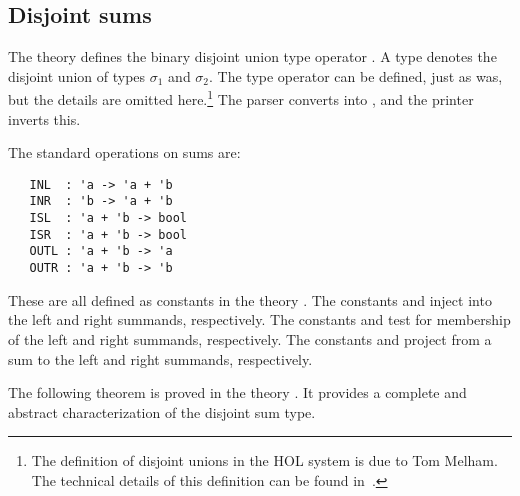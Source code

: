 \subsection{Disjoint sums}
\label{sum}


The theory  defines the binary disjoint union type
operator .  A type 
denotes the disjoint union of types $\sigma_1$ and $\sigma_2$.  The
type operator  can be defined, just as  was,
but the details are omitted here.\footnote{The definition of disjoint
  unions in the HOL system is due to Tom Melham. The technical details
  of this definition can be found in~\cite{Melham-banff}.}  The \HOL{}
parser
%
%
converts 
%
%
into , and the printer inverts
this.

The standard operations on sums are:

\begin{hol}
{\small
\begin{verbatim}
   INL  : 'a -> 'a + 'b
   INR  : 'b -> 'a + 'b
   ISL  : 'a + 'b -> bool
   ISR  : 'a + 'b -> bool
   OUTL : 'a + 'b -> 'a
   OUTR : 'a + 'b -> 'b
\end{verbatim}
}
\end{hol}

\noindent These are all defined as constants in the theory .  The
constants  and  inject into the left and right summands,
respectively. The constants  and  test for membership of the
left and right summands, respectively. The constants  and 
project from a sum to the left and right summands, respectively.

The following theorem is proved in the theory . It provides a
complete and abstract characterization of the disjoint sum type.

